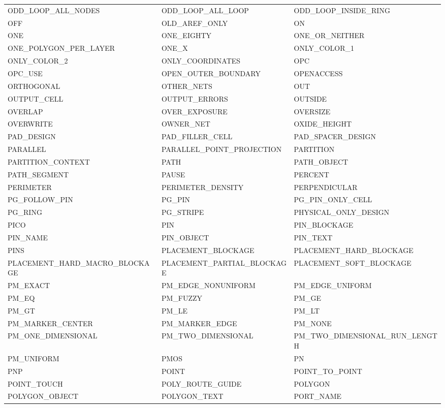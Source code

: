 \begin{longtable}{@{}>{\raggedright\arraybackslash\ttfamily}p{} >{\raggedright\arraybackslash\ttfamily}p{} >{\raggedright\arraybackslash\ttfamily}p{}@{}}
ODD\_LOOP\_ALL\_NODES & ODD\_LOOP\_ALL\_LOOP & ODD\_LOOP\_INSIDE\_RING \\
OFF & OLD\_AREF\_ONLY & ON \\
ONE & ONE\_EIGHTY & ONE\_OR\_NEITHER \\
ONE\_POLYGON\_PER\_LAYER & ONE\_X & ONLY\_COLOR\_1 \\
ONLY\_COLOR\_2 & ONLY\_COORDINATES & OPC \\
OPC\_USE & OPEN\_OUTER\_BOUNDARY & OPENACCESS \\
ORTHOGONAL & OTHER\_NETS & OUT \\
OUTPUT\_CELL & OUTPUT\_ERRORS & OUTSIDE \\
OVERLAP & OVER\_EXPOSURE & OVERSIZE \\
OVERWRITE & OWNER\_NET & OXIDE\_HEIGHT \\
PAD\_DESIGN & PAD\_FILLER\_CELL & PAD\_SPACER\_DESIGN \\
PARALLEL & PARALLEL\_POINT\_PROJECTION & PARTITION \\
PARTITION\_CONTEXT & PATH & PATH\_OBJECT \\
PATH\_SEGMENT & PAUSE & PERCENT \\
PERIMETER & PERIMETER\_DENSITY & PERPENDICULAR \\
PG\_FOLLOW\_PIN & PG\_PIN & PG\_PIN\_ONLY\_CELL \\
PG\_RING & PG\_STRIPE & PHYSICAL\_ONLY\_DESIGN \\
PICO & PIN & PIN\_BLOCKAGE \\
PIN\_NAME & PIN\_OBJECT & PIN\_TEXT \\
PINS & PLACEMENT\_BLOCKAGE & PLACEMENT\_HARD\_BLOCKAGE \\
PLACEMENT\_HARD\_MACRO\_BLOCKAGE & PLACEMENT\_PARTIAL\_BLOCKAGE & PLACEMENT\_SOFT\_BLOCKAGE \\
PM\_EXACT & PM\_EDGE\_NONUNIFORM & PM\_EDGE\_UNIFORM \\
PM\_EQ & PM\_FUZZY & PM\_GE \\
PM\_GT & PM\_LE & PM\_LT \\
PM\_MARKER\_CENTER & PM\_MARKER\_EDGE & PM\_NONE \\
PM\_ONE\_DIMENSIONAL & PM\_TWO\_DIMENSIONAL & PM\_TWO\_DIMENSIONAL\_RUN\_LENGTH \\
PM\_UNIFORM & PMOS & PN \\
PNP & POINT & POINT\_TO\_POINT \\
POINT\_TOUCH & POLY\_ROUTE\_GUIDE & POLYGON \\
POLYGON\_OBJECT & POLYGON\_TEXT & PORT\_NAME \\

\end{longtable}
